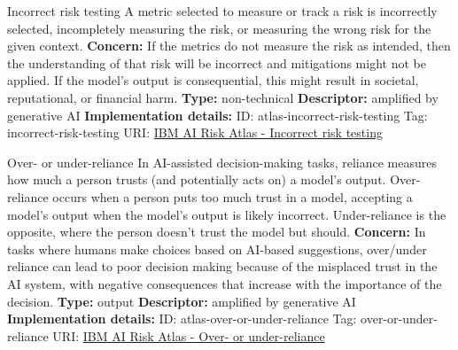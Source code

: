\begin{definitionbox}{Incorrect risk testing}
A metric selected to measure or track a risk is incorrectly selected, incompletely measuring the risk, or measuring the wrong risk for the given context.\newline\newline
\textbf{Concern: }If the metrics do not measure the risk as intended, then the understanding of that risk will be incorrect and mitigations might not be applied. If the model's output is consequential, this might result in societal, reputational, or financial harm.\newline\newline
\textbf{Type: }non-technical\newline
\textbf{Descriptor: }amplified by generative AI \newline\newline
\textbf{Implementation details: } \newline
ID: atlas-incorrect-risk-testing \newline
Tag: incorrect-risk-testing \newline
URI:  \href{https://www.ibm.com/docs/en/watsonx/saas?topic=SSYOK8/wsj/ai-risk-atlas/incorrect-risk-testing.html}{IBM AI Risk Atlas - Incorrect risk testing}\newline
\end{definitionbox}
\begin{definitionbox}{Over- or under-reliance}
In AI-assisted decision-making tasks, reliance measures how much a person trusts (and potentially acts on) a model's output. Over-reliance occurs when a person puts too much trust in a model, accepting a model's output when the model's output is likely incorrect. Under-reliance is the opposite, where the person doesn't trust the model but should.\newline\newline
\textbf{Concern: }In tasks where humans make choices based on AI-based suggestions, over/under reliance can lead to poor decision making because of the misplaced trust in the AI system, with negative consequences that increase with the importance of the decision.\newline\newline
\textbf{Type: }output\newline
\textbf{Descriptor: }amplified by generative AI \newline\newline
\textbf{Implementation details: } \newline
ID: atlas-over-or-under-reliance \newline
Tag: over-or-under-reliance \newline
URI:  \href{https://www.ibm.com/docs/en/watsonx/saas?topic=SSYOK8/wsj/ai-risk-atlas/over-or-under-reliance.html}{IBM AI Risk Atlas - Over- or under-reliance}\newline
\end{definitionbox}
